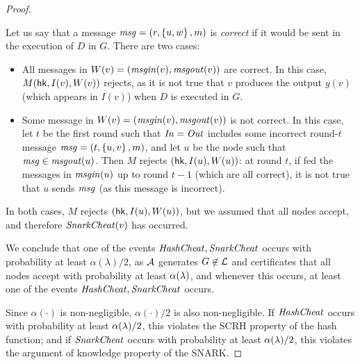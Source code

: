 \begin{proof}
\begin{itemize}
			Let us say that a message $\mathit{ msg } = (r, \left \{{u,w} \right \}, m)$
			is \emph{correct} if it would be sent in the execution of $D$ in $G$.
			There are two cases:
			\begin{itemize}
				\item All messages in $W(v) = (\mathit{ msgin }(v), \mathit{ msgout }(v))$
					are correct.
					In this case, $M( \mathsf{hk}, I(v), W(v))$
					rejects, as it is not true that $v$
					produces the output $y(v)$ (which appears in $I(v)$)
					when $D$ is executed in $G$.
				\item Some message in $W(v) = (\mathit{ msgin }(v), \mathit{ msgout }(v))$
					is not correct.
					In this case,
				let $t$ be the first round such that $\mathit{ In } = \mathit{ Out }$ 
			includes some incorrect round-$t$ message $\mathit{ msg } = (t, \left \{{u,v} \right \}, m)$,
			and let $u$ be the node such that $\mathit{ msg } \in \mathit{ msgout }(u)$.
			Then $M$ rejects $(\mathsf{hk}, I(u), W(u))$:
			at round $t$, if fed the messages in $\mathit{ msgin }(u)$ up to round $t - 1$
			(which are all correct),
			it is not true that $u$ sends $\mathit{ msg }$ (as this message is incorrect).
			\end{itemize}
			In both cases, $M$ rejects $(\mathsf{hk}, I(u), W(u))$,
			but we assumed that all nodes accept,
			and therefore $\mathit{ SnarkCheat }(v)$ has occurred.
	\end{itemize}
	We conclude that one of the events $\mathit{ HashCheat },\mathit{ SnarkCheat }$
	occurs with probability at least $\alpha(\lambda)/2$,
	as $\mathcal{A}$ generates $G \not \in \mathcal{L}$ and certificates that all nodes accept
	with probability at least $\alpha(\lambda)$,
	and whenever this occurs, at least one of the events 
 	$\mathit{ HashCheat }, \mathit{ SnarkCheat }$ occurs.

	Since $\alpha(\cdot)$ is non-negligible, $\alpha(\cdot) / 2$
	is also non-negligible.
	If $\mathit{ HashCheat }$ occurs with probability at least $\alpha(\lambda) / 2$,
	this violates the SCRH property of the hash function;
	and if $\mathit{ SnarkCheat }$ occurs with probability at least $\alpha(\lambda) / 2$,
	this violates the argument of knowledge property of the SNARK.
\end{proof}



\begin{theorem}
	\label{thm:dist}
\end{theorem}

